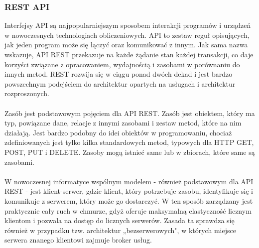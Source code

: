 \documentclass[12pt,a4paper]{article}
\begin{document}
        \subsubsection{REST API}

Interfejsy API są najpopularniejszym sposobem interakcji programów i urządzeń w nowoczesnych technologiach obliczeniowych. API to zestaw reguł opisujących, jak jeden program może się łączyć oraz komunikować z innym. Jak sama nazwa wskazuje, API REST przekazuje na każde żądanie stan każdej transakcji, co daje korzyści związane z opracowaniem, wydajnością i zasobami w porównaniu do innych metod. REST rozwija się w ciągu ponad dwóch dekad i jest bardzo powszechnym podejściem do architektur opartych na usługach i architektur rozproszonych.
\\\\

Zasób jest podstawowym pojęciem dla API REST. Zasób jest obiektem, który ma typ, powiązane dane, relacje z innymi zasobami i zestaw metod, które na nim działają. Jest bardzo podobny do idei obiektów w programowaniu, chociaż zdefiniowanych jest tylko kilka standardowych metod, typowych dla HTTP GET, POST, PUT i DELETE. Zasoby mogą istnieć same lub w zbiorach, które same są zasobami.
\\\\

W nowoczesnej informatyce wspólnym modelem - również podstawowym dla API REST - jest klient-serwer, gdzie klient, który potrzebuje zasobu, identyfikuje się i komunikuje z serwerem, który może go dostarczyć. W ten sposób zarządzany jest praktycznie cały ruch w chmurze, gdyż oferuje maksymalną elastyczność licznym klientom i pozwala na dostęp do licznych serwerów. Zasada ta sprawdza się również w przypadku tzw. architektur „bezserwerowych", w których miejsce serwera znanego klientowi zajmuje broker usług.

\newpage
\end{document}
